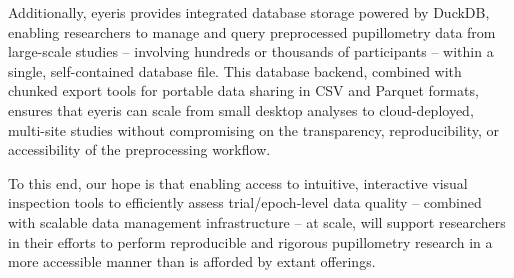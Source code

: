 Additionally, eyeris provides integrated database storage powered by DuckDB, enabling researchers to manage and query preprocessed pupillometry data from large-scale studies – involving hundreds or thousands of participants – within a single, self-contained database file. This database backend, combined with chunked export tools for portable data sharing in CSV and Parquet formats, ensures that eyeris can scale from small desktop analyses to cloud-deployed, multi-site studies without compromising on the transparency, reproducibility, or accessibility of the preprocessing workflow.

To this end, our hope is that enabling access to intuitive, interactive visual inspection tools to efficiently assess trial/epoch-level data quality – combined with scalable data management infrastructure – at scale, will support researchers in their efforts to perform reproducible and rigorous pupillometry research in a more accessible manner than is afforded by extant offerings.
